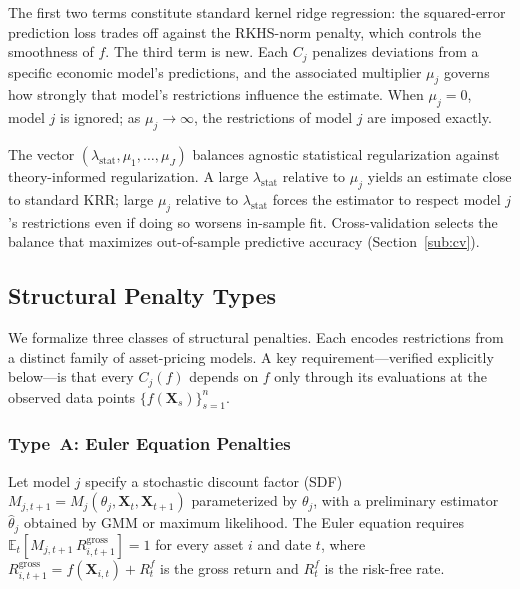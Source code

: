 The first two terms constitute standard kernel ridge regression:
the squared-error prediction loss trades off against the RKHS-norm penalty,
which controls the smoothness of $f$.
The third term is new.
Each $C_j$ penalizes deviations from a specific economic model's
predictions, and the associated multiplier $\mu_j$ governs how strongly
that model's restrictions influence the estimate.
When $\mu_j = 0$, model $j$ is ignored; as $\mu_j \to \infty$,
the restrictions of model $j$ are imposed exactly.

\begin{remark}
\label{rem:multipliers}
The vector $(\lambda_{\mathrm{stat}}, \mu_1, \ldots, \mu_J)$ balances
agnostic statistical regularization against theory-informed regularization.
A large $\lambda_{\mathrm{stat}}$ relative to $\mu_j$ yields an estimate
close to standard KRR; large $\mu_j$ relative to $\lambda_{\mathrm{stat}}$
forces the estimator to respect model $j$'s restrictions even if doing
so worsens in-sample fit.
Cross-validation selects the balance that maximizes out-of-sample
predictive accuracy (Section~\ref{sub:cv}).
\end{remark}

\subsection{Structural Penalty Types}
\label{sub:penalties}

We formalize three classes of structural penalties.
Each encodes restrictions from a distinct family of asset-pricing models.
A key requirement---verified explicitly below---is that every $C_j(f)$
depends on $f$ only through its evaluations at the observed data points
$\{f(\mathbf{X}_s)\}_{s=1}^n$.

\subsubsection{Type~A: Euler Equation Penalties}
\label{sub:euler}

Let model $j$ specify a stochastic discount factor (SDF)
$M_{j,t+1} = M_j(\theta_j, \mathbf{X}_t, \mathbf{X}_{t+1})$
parameterized by $\theta_j$, with a preliminary estimator
$\hat{\theta}_j$ obtained by GMM or maximum likelihood.
The Euler equation requires
$\mathbb{E}_t[M_{j,t+1}\, R_{i,t+1}^{\mathrm{gross}}] = 1$
for every asset $i$ and date $t$,
where $R_{i,t+1}^{\mathrm{gross}} = f(\mathbf{X}_{i,t}) + R_t^f$
is the gross return and $R_t^f$ is the risk-free rate.

